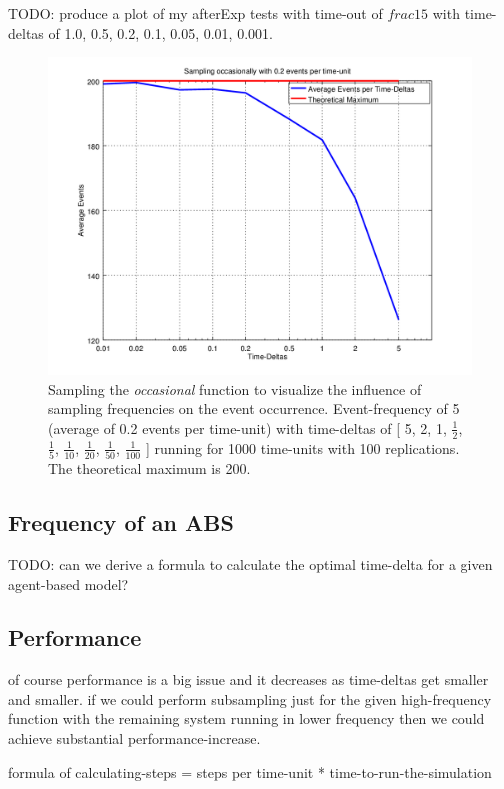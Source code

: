 TODO: produce a plot of my afterExp tests with time-out of $frac{1}{5}$ with time-deltas of 1.0, 0.5, 0.2, 0.1, 0.05, 0.01, 0.001.

\begin{figure}
	\centering
	\includegraphics[width=.6\textwidth, angle=0]{./../shared/fig/samplingTest_occasionally_02evts.png}
	\caption{Sampling the \textit{occasional} function to visualize the influence of sampling frequencies on the event occurrence. Event-frequency of 5 (average of 0.2 events per time-unit) with time-deltas of [ 5, 2, 1, $\frac{1}{2}$, $\frac{1}{5}$, $\frac{1}{10}$, $\frac{1}{20}$, $\frac{1}{50}$, $\frac{1}{100}$ ] running for 1000 time-units with 100 replications. The theoretical maximum is 200.}
	\label{fig:sampling_occasionally_02evts}
\end{figure}

\subsection{Frequency of an ABS}
TODO: can we derive a formula to calculate the optimal time-delta for a given agent-based model?

\subsection{Performance}
of course performance is a big issue and it decreases as time-deltas get smaller and smaller. if we could perform subsampling just for the given high-frequency function with the remaining system running in lower frequency then we could achieve substantial performance-increase.

formula of calculating-steps = steps per time-unit * time-to-run-the-simulation